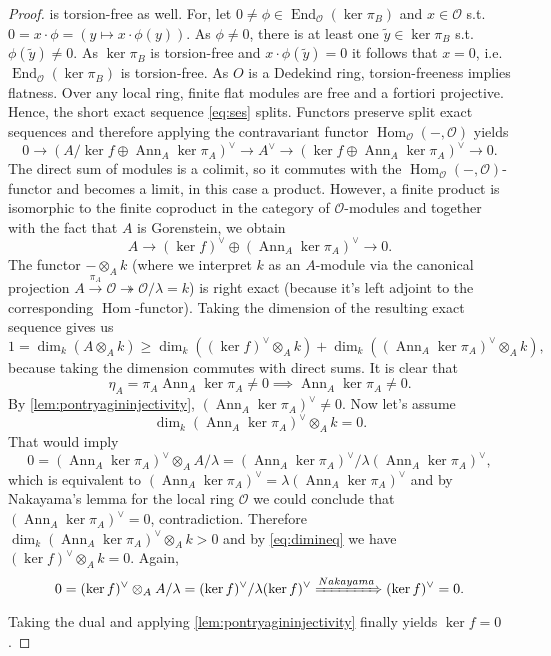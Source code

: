 \documentclass{article}
\theoremstyle{plain}%
\theoremstyle{definition}
\theoremstyle{remark}
\newcommand{\ann}{\operatorname{Ann}}
\renewcommand{\hom}{\operatorname{Hom}}
\begin{document}
\begin{proof}
    is torsion-free as well. For, let \(0 \neq \phi \in \operatorname{End}_\mathcal{O}(\ker \pi_B)\) and 
    \(x \in \mathcal{O}\) s.t. \(0 = x \cdot \phi = (y \mapsto x \cdot \phi(y))\).
    As \(\phi \neq 0\), there is at least one \(\tilde y \in \ker \pi_B\) s.t. \(\phi(\tilde y) \neq 0\).
    As \(\ker \pi_B\) is torsion-free and \(x \cdot \phi(\tilde y) = 0\) it follows that \(x = 0\), i.e.
    \(\operatorname{End}_\mathcal{O}(\ker \pi_B)\) is torsion-free.
    As \(O\) is a Dedekind ring, torsion-freeness implies flatness. Over any local ring, finite flat
    modules are free and a fortiori projective. Hence, the short exact sequence \eqref{eq:ses} splits.
    Functors preserve split exact sequences and therefore applying the contravariant functor
    \(\hom_\mathcal{O}(-, \mathcal{O})\) yields
    \[
        0 \longrightarrow (A/\ker f \oplus \ann_A \ker \pi_A)^\vee  \longrightarrow A^\vee
        \longrightarrow (\ker f \oplus \ann_A \ker \pi_A)^\vee \longrightarrow 0.
    \]
    The direct sum of modules is a colimit, so it commutes with the 
    \(\hom_\mathcal{O}(-, \mathcal{O})\)-functor and becomes a limit, in this case a product.
    However, a finite product is isomorphic to the finite coproduct in the category of \(\mathcal{O}\)-modules
    and together with the fact that \(A\) is Gorenstein, we obtain
    \[
        A \longrightarrow (\ker f)^\vee \oplus (\ann_A \ker \pi_A)^\vee \longrightarrow 0.
    \]
    The functor \(- \otimes_A k\) (where we interpret \(k\) as an \(A\)-module via the canonical projection
    \(A \xrightarrow{\pi_A} \mathcal{O} \twoheadrightarrow \mathcal{O}/\lambda = k\)) 
    is right exact (because it's left adjoint to the corresponding \(\hom\)-functor).
    Taking the dimension of the resulting exact sequence gives us 
    \[
        1 = \dim_k(A\otimes_A k) \geq \dim_k ((\ker f)^\vee \otimes_A k)
        + \dim_k ((\ann_A \ker \pi_A)^\vee\otimes_A k),
        \tag{\textasteriskcentered\textasteriskcentered} \label{eq:dimineq}
    \]
    because taking the dimension commutes with direct sums.
    It is clear that 
    \[
        \eta_A = \pi_A \ann_A \ker \pi_A \neq 0 \implies \ann_A \ker \pi_A \neq 0.
    \]
    By \cref{lem:pontryagininjectivity}, \((\ann_A\ker \pi_A)^\vee \neq 0\).
    Now let's assume 
    \[
        \dim_k(\ann_A\ker \pi_A)^\vee \otimes_A k = 0.
    \]
    That would imply
    \[
        0 = (\ann_A\ker \pi_A)^\vee \otimes_A A/\lambda = (\ann_A\ker \pi_A)^\vee/\lambda (\ann_A\ker \pi_A)^\vee,
    \]
    which is equivalent to \((\ann_A\ker \pi_A)^\vee = \lambda (\ann_A\ker \pi_A)^\vee\) and
    by Nakayama's lemma for the local ring \(\mathcal{O}\) we could conclude that \((\ann_A\ker \pi_A)^\vee = 0\),
    contradiction. Therefore \(\dim_k (\ann_A\ker \pi_A)^\vee \otimes_A k > 0\) and by \eqref{eq:dimineq} 
    we have \((\ker f)^\vee \otimes_A k = 0\).
    Again,
    \[
        0 = (\ker f)^\vee \otimes_A A/\lambda = (\ker f)^\vee/\lambda(\ker f)^\vee \xRightarrow{Nakayama} (\ker f)^\vee = 0.
    \]
    Taking the dual and applying \cref{lem:pontryagininjectivity} finally yields \(\ker f = 0\).
\end{proof}
\end{document}
